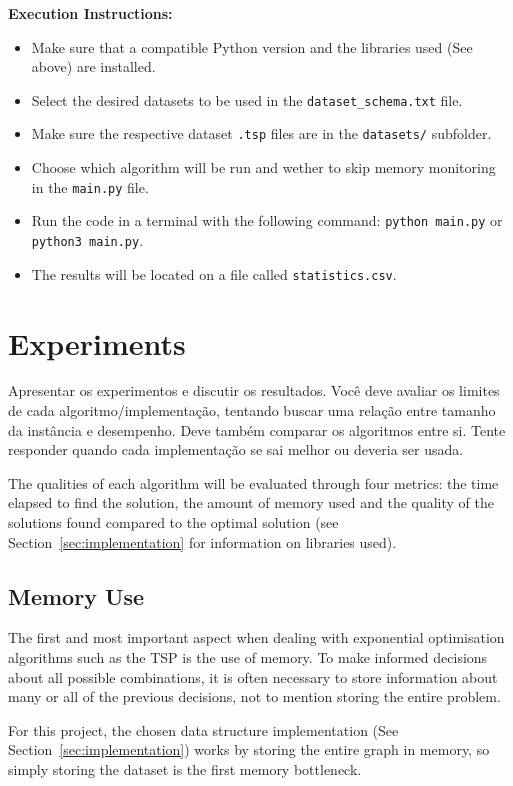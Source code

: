 \documentclass[12pt]{article}
\begin{document}
\textbf{Execution Instructions:}
\begin{itemize}
  \item Make sure that a compatible Python version and the libraries used (See above) are installed.
  \item Select the desired datasets to be used in the \texttt{dataset\_schema.txt} file.
  \item Make sure the respective dataset \texttt{.tsp} files are in the \texttt{datasets/} subfolder.
  \item Choose which algorithm will be run and wether to skip memory monitoring in the \texttt{main.py} file.
  \item Run the code in a terminal with the following command: \texttt{python main.py} or \texttt{python3 main.py}.
  \item The results will be located on a file called \texttt{statistics.csv}.
\end{itemize}

\section{Experiments} \label{sec:experiments}
    Apresentar os experimentos e discutir os resultados. Você deve avaliar os
    limites de cada algoritmo/implementação, tentando buscar uma relação entre
    tamanho da instância e desempenho. Deve também comparar os algoritmos
    entre si. Tente responder quando cada implementação se sai melhor ou
    deveria ser usada.

The qualities of each algorithm will be evaluated through four metrics: the time elapsed 
to find the solution, the amount of memory used and the quality of the solutions found 
compared to the optimal solution (see Section~\ref{sec:implementation} for information 
on libraries used).

\subsection{Memory Use} \label{sec:exp_memory}

The first and most important aspect when dealing with exponential optimisation algorithms such as 
the TSP is the use of memory. To make informed decisions about all possible combinations, 
it is often necessary to store information about many or all of the previous decisions, not to 
mention storing the entire problem.

For this project, the chosen data structure implementation (See Section~\ref{sec:implementation}) works by storing 
the entire graph in memory, so simply storing the dataset is the first memory bottleneck.
\end{document}

